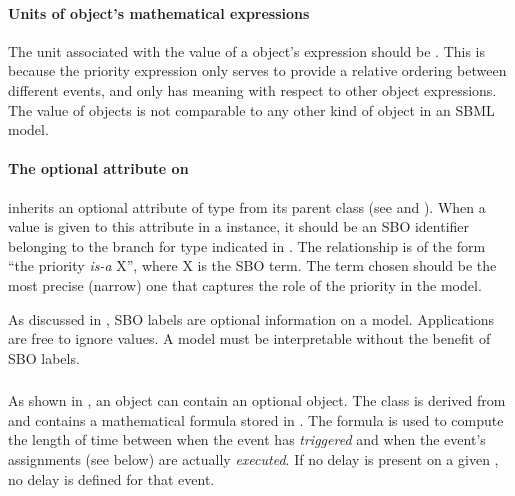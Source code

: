 \paragraph{Units of  object's mathematical
  expressions}

The unit associated with the value of a \Priority object's
 expression should be .  This is
because the priority expression only serves to provide a relative
ordering between different events, and only has meaning with
respect to other \Priority object expressions.  The value of
\Priority objects is not comparable to any other kind of object in
an SBML model.


\paragraph{The optional  attribute on }
\label{sec:priority-sboterm}

\Priority inherits an optional  attribute of type
 from its parent class \SBase (see
 and ).  When a
value is given to this attribute in a \Priority instance, it
should be an SBO identifier belonging to the branch for type
\Priority indicated in .  The
relationship is of the form ``the priority \emph{is-a} X'', where
X is the SBO term.  The term chosen should be the most precise
(narrow) one that captures the role of the priority in the model.

As discussed in , SBO labels are optional
information on a model.  Applications are free to ignore
 values.  A model must be interpretable without the
benefit of SBO labels.


\subsubsection{}
\label{sec:event-delay}

As shown in , an \Event object can contain
an optional \Delay object.  The \Delay class is derived from
\SBase and contains a mathematical formula stored in .
The formula is used to compute the length of time between when the
event has \emph{triggered} and when the event's assignments (see
below) are actually \emph{executed}.  If no delay is present on a
given \Event, no delay is defined for that event.


